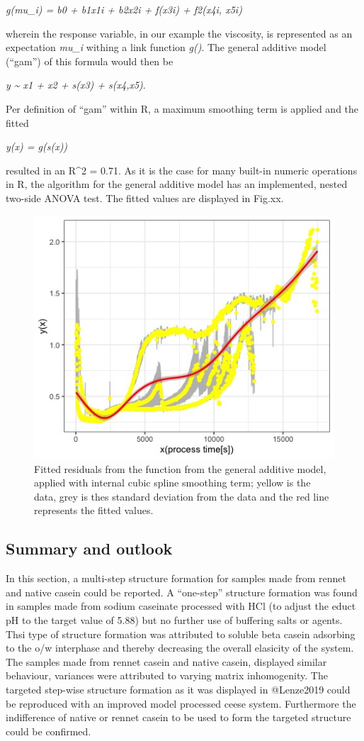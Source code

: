 \documentclass[
]{article}
\begin{document}
\emph{g(mu\_i) = b0 + b1x1i + b2x2i + f(x3i) + f2(x4i, x5i)}

wherein the response variable, in our example the viscosity, is
represented as an expectation \emph{mu\_i} withing a link function
\emph{g()}. The general additive model (``gam'') of this formula would
then be

\emph{y \textasciitilde{} x1 + x2 + s(x3) + s(x4,x5)}.

Per definition of ``gam'' within R, a maximum smoothing term is applied
and the fitted

\emph{y(x) = g(s(x))}

resulted in an R\^{}2 = 0.71. As it is the case for many built-in
numeric operations in R, the algorithm for the general additive model
has an implemented, nested two-side ANOVA test. The fitted values are
displayed in Fig.xx.

\begin{figure}
\includegraphics[width=0.75\linewidth]{plots/6.11_visco.fit.high.smooth} \caption[fitted model flow curve]{Fitted residuals from the function from the general additive model, applied with internal cubic spline smoothing term; yellow is the data, grey is thes standard deviation from the data and the red line represents the fitted values.}\label{fig:unnamed-chunk-14}
\end{figure}

\subsection{Summary and outlook}

In this section, a multi-step structure formation for samples made from
rennet and native casein could be reported. A ``one-step'' structure
formation was found in samples made from sodium caseinate processed with
HCl (to adjust the educt pH to the target value of 5.88) but no further
use of buffering salts or agents. Thsi type of structure formation was
attributed to soluble beta casein adsorbing to the o/w interphase and
thereby decreasing the overall elasicity of the system. The samples made
from rennet casein and native casein, displayed similar behaviour,
variances were attributed to varying matrix inhomogenity. The targeted
step-wise structure formation as it was displayed in @Lenze2019 could be
reproduced with an improved model processed ceese system. Furthermore
the indifference of native or rennet casein to be used to form the
targeted structure could be confirmed.
\end{document}
